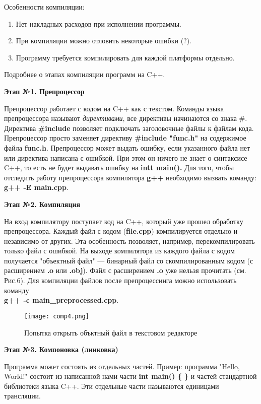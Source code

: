 \documentclass[12pt]{article}
\begin{document}
Особенности компиляции:
\begin{enumerate}
\item Нет накладных расходов при исполнении программы.
\item При компиляции можно отловить некоторые ошибки (?).
\item Программу требуется компилировать для каждой платформы отдельно.
\end{enumerate}

Подробнее о этапах компиляции программ на C++.

\textbf{Этап №1. Препроцессор}

Препроцессор работает с кодом на C++ как с текстом. Команды языка препроцессора называют \textit{директивами}, все директивы начинаются со знака \#. Директива\textbf{ \#include} позволяет подключать заголовочные файлы к файлам кода. Препроцессор просто заменяет директиву \textbf{\#include "func.h"} на содержимое файла \textbf{func.h}.
Препроцессор может выдать ошибку, если указанного файла нет или директива написана с ошибкой. При этом он ничего не знает о синтаксисе C++, то есть не будет выдавать ошибку на \textbf{intt main().} Для того, чтобы отследить работу препроцессора компилятора \textbf{g++} необходимо вызвать команду: \\ 
\textbf{g++ -E main.cpp}.

\textbf{Этап №2. Компиляция}

На вход компилятору поступает код на C++, который уже прошел обработку препроцессора. Каждый файл с кодом (\textbf{file.cpp}) компилируется отдельно и независимо от других. Эта особенность позволяет, например, перекомпилировать только файл с ошибкой. На выходе компилятора из каждого файла с кодом получается "объектный файл" --- бинарный файл со скомпилированным кодом (с расширением \textbf{.o} или \textbf{.obj}). Файл с расширением \textbf{.o} уже нельзя прочитать (см. Рис.6). Для компиляции файлов после препроцессинга можно использовать команду \\
\textbf{g++ -c main\_preprocessed.cpp}.

\begin{figure}
\centering
\texttt{[image: comp4.png]}
\caption{Попытка открыть объктный файл в текстовом редакторе}
\label{fig:mpr}
\end{figure} 

\textbf{Этап №3. Компоновка (линковка)}

Программа может состоять из отдельных частей. Пример: программа "Hello, World!" состоит из написанной нами части \textbf{int main() \{ \}} и частей стандартной библиотеки языка C++. Эти отдельные части называются единицами трансляции.
\end{document}
